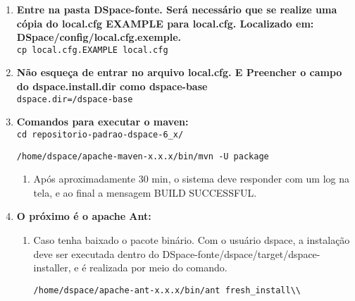 \documentclass[12pt,hidelinks]{article}
\begin{document}
\begin{enumerate}
        \item \textbf{Entre na pasta DSpace-fonte.  Será necessário que se realize uma cópia do local.cfg EXAMPLE para local.cfg. Localizado em: DSpace/config/local.cfg.exemple.}\\
        
            \texttt{cp local.cfg.EXAMPLE local.cfg}\\
            
        \item \textbf{Não esqueça de entrar no arquivo local.cfg. E Preencher o campo do dspace.install.dir como dspace-base}\\
            
            \texttt{dspace.dir=/dspace-base}\\
        
        \item \textbf{Comandos para executar o maven:}\\
        
            \texttt{cd repositorio-padrao-dspace-6\_x/}\\
            
             \begin{verbatim}
/home/dspace/apache-maven-x.x.x/bin/mvn -U package
            \end{verbatim}
            
            \begin{enumerate}
            \item Após aproximadamente 30 min, o sistema deve responder com um log na tela, e ao final a mensagem BUILD SUCCESSFUL.\\

            \end{enumerate}
            
        \item \textbf{O próximo é o apache Ant:}\\
        
         \begin{enumerate}
            \item Caso tenha baixado o pacote binário. Com o usuário dspace, a instalação deve ser executada dentro do DSpace-fonte/dspace/target/dspace-installer, e é realizada por meio do comando.\\
            
                \begin{verbatim}
/home/dspace/apache-ant-x.x.x/bin/ant fresh_install\\
            \end{verbatim}
            

\end{enumerate}
\end{enumerate}
\end{document}
